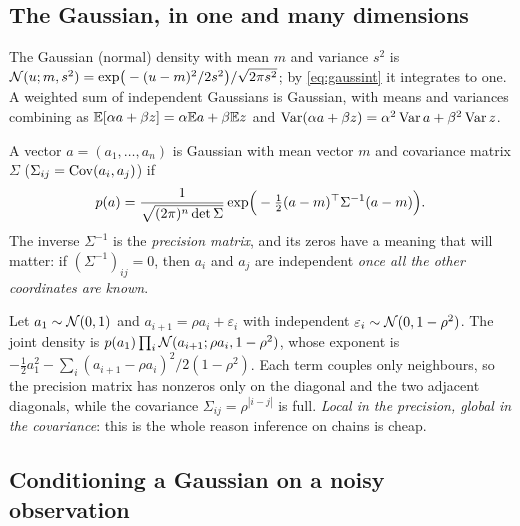 \subsection{The Gaussian, in one and many dimensions}

The Gaussian (normal) density with mean $m$ and variance $s^2$ is
$\mathcal{N}(u;m,s^2)=\exp\!\big(-(u-m)^2/2s^2\big)/\sqrt{2\pi s^2}$; by \eqref{eq:gaussint} it integrates to one. A
weighted sum of independent Gaussians is Gaussian, with means and variances combining as
$\mathbb{E}[\alpha a+\beta z]=\alpha\mathbb{E} a+\beta\mathbb{E} z$ and $\operatorname{Var}(\alpha a+\beta z)=\alpha^2\operatorname{Var} a+\beta^2\operatorname{Var} z$.

A vector $a=(a_1,\dots,a_n)$ is Gaussian with mean vector $m$ and covariance matrix $\Sigma$
($\Sigma_{ij}=\operatorname{Cov}(a_i,a_j)$) if
\begin{equation}\label{eq:mvn}
  p(a)=\frac{1}{\sqrt{(2\pi)^n\det\Sigma}}\exp\!\Big(-\tfrac12(a-m)^{\top}\Sigma^{-1}(a-m)\Big).
\end{equation}
The inverse $\Sigma^{-1}$ is the \emph{precision matrix}, and its zeros have a meaning that will matter: if
$(\Sigma^{-1})_{ij}=0$, then $a_i$ and $a_j$ are independent \emph{once all the other coordinates are known}.

\begin{example}
Let $a_1\sim\mathcal{N}(0,1)$ and $a_{i+1}=\rho a_i+\varepsilon_i$ with independent $\varepsilon_i\sim\mathcal{N}(0,1-\rho^2)$. The joint
density is $p(a_1)\prod_i\mathcal{N}(a_{i+1};\rho a_i,1-\rho^2)$, whose exponent is
$-\tfrac12a_1^2-\sum_i(a_{i+1}-\rho a_i)^2/2(1-\rho^2)$. Each term couples only neighbours, so the precision
matrix has nonzeros only on the diagonal and the two adjacent diagonals, while the covariance
$\Sigma_{ij}=\rho^{|i-j|}$ is full. \emph{Local in the precision, global in the covariance}: this is the whole
reason inference on chains is cheap.
\end{example}

\subsection{Conditioning a Gaussian on a noisy observation}\label{sec:gausscond}

